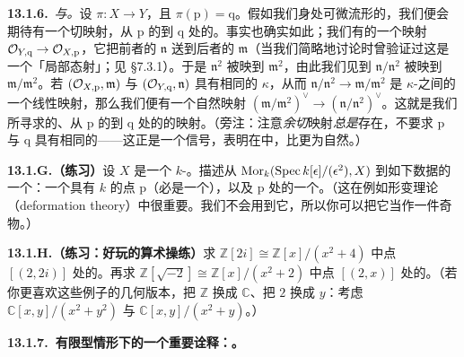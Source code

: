 \textbf{13.1.6.}\ \emph{\trMorphism{}与\trTangentSpace。}\quad 设 $\pi\colon X\to Y$，且 $\pi(\mathrm{p})=\mathrm{q}$。假如我们身处可微流形的\trCategory，我们便会期待有一个切映射，从 $\mathrm{p}$ 的\trTangentSpace{}到 $\mathrm{q}$ 处的\trTangentSpace。事实也确实如此；我们有\trStalk{}的一个映射 $\mathcal{O}_{Y,\mathrm{q}}\to\mathcal{O}_{X,\mathrm{p}}$，它把前者的\trMaximalIdeal{} $\mathfrak{n}$ 送到后者的\trMaximalIdeal{} $\mathfrak{m}$（当我们简略地讨论\trLocallyRingedSpace{}时曾验证过这是一个「局部态射」；见 \S7.3.1）。于是 $\mathfrak{n}^2$ 被映到 $\mathfrak{m}^2$，由此我们见到 $\mathfrak{n}/\mathfrak{n}^2$ 被映到 $\mathfrak{m}/\mathfrak{m}^2$。若 $(\mathcal{O}_{X,\mathrm{p}},\mathfrak{m})$ 与 $(\mathcal{O}_{Y,\mathrm{q}},\mathfrak{n})$ 具有相同的\trResidueField{} $\kappa$，从而 $\mathfrak{n}/\mathfrak{n}^2\to\mathfrak{m}/\mathfrak{m}^2$ 是 $\kappa$-\trVectorSpace{}之间的一个线性映射，那么我们便有一个自然映射 $(\mathfrak{m}/\mathfrak{m}^2)^{\vee}\to(\mathfrak{n}/\mathfrak{n}^2)^{\vee}$。这就是我们所寻求的、从 $\mathrm{p}$ 的\trTangentSpace{}到 $\mathrm{q}$ 处的\trTangentSpace{}的映射。（旁注：注意\emph{余切}映射\emph{总是}存在，不要求 $\mathrm{p}$ 与 $\mathrm{q}$ 具有相同的\trResidueField——这正是一个信号，表明在\trAlgebraicGeometry{}中，\trCotangentSpace{}比\trTangentSpace{}更为自然。）

\textbf{13.1.G.（练习）}\quad 设 $X$ 是一个 $k$-\trScheme。描述从 $\operatorname{Mor}_k(\operatorname{Spec} k[\epsilon]/(\epsilon^2),X)$ 到如下数据的一个\trNatural{}\trBijection：一个具有\trResidueField{} $k$ 的点 $\mathrm{p}$（必是一个\trClosedPoint），以及 $\mathrm{p}$ 处的一个\trTangentVector。（这在例如形变理论（deformation theory）中很重要。我们不会用到它，所以你可以把它当作一件奇物。）

\textbf{13.1.H.（练习：好玩的算术操练）}\quad 求 $\mathbb{Z}[2i]\cong\mathbb{Z}[x]/(x^2+4)$ 中点 $[(2,2i)]$ 处\trZariski{}\trTangentSpace{}的\trDimension。再求 $\mathbb{Z}[\sqrt{-2}]\cong\mathbb{Z}[x]/(x^2+2)$ 中点 $[(2,x)]$ 处\trZariski{}\trTangentSpace{}的\trDimension。（若你更喜欢这些例子的几何版本，把 $\mathbb{Z}$ 换成 $\mathbb{C}$、把 $2$ 换成 $y$：考虑 $\mathbb{C}[x,y]/(x^2+y^2)$ 与 $\mathbb{C}[x,y]/(x^2+y)$。）

\textbf{13.1.7.\ 有限型情形下的一个重要诠释：\trJacobianMatrix{}\trCorank。}

